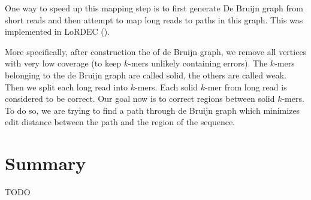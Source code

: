 One way to speed up this mapping step is to first generate De Bruijn graph from short reads
and then attempt to map long reads to paths in this graph. This was implemented
in LoRDEC (\cite{Lordec}).

More specifically, after construction the of de Bruijn graph, we remove all vertices
with very low coverage (to keep $k$-mers unlikely containing errors). The $k$-mers belonging
to the de Bruijn graph are called solid, the others are called weak.
Then we split each long read into $k$-mers.
Each solid $k$-mer from long read is considered to be correct. 
Our goal now is to correct regions between solid $k$-mers. To do so, we are trying
to find a path through de Bruijn graph which minimizes edit distance between the path
and the region of the sequence.

\section{Summary}

TODO

